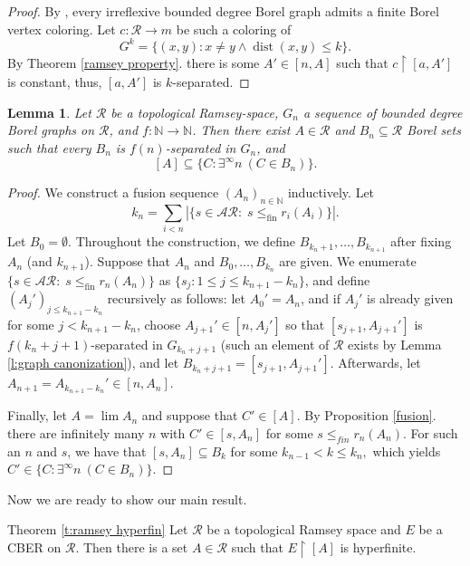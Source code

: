 \documentclass[11pt]{amsart}
\newcommand{\thistheoremname}{}
\newtheorem*{genericthm*}{\thistheoremname}
\newenvironment{namedthm*}[1]
{\renewcommand{\thistheoremname}{#1}%
	\begin{genericthm*}}
	{\end{genericthm*}}
\newcommand{\N}{\mathbb{N}}
\renewcommand{\restriction}[2]{#1 \upharpoonright #2}
\newtheorem{lemma}[theorem]{Lemma}
\theoremstyle{definition}
\numberwithin{equation}{section}
\DeclareMathOperator{\dist}{dist}
\newcommand{\mc}{\mathcal}
\newcommand{\rstr}{\restriction}
\newcommand{\sse}{\subseteq}
\newcommand{\est}{\emptyset}
\newcommand{\fA}{\mathcal{A}}
\newcommand{\fR}{\mathcal{R}}
\begin{document}
	
	
	\begin{proof}
		By \cite{KST}, every irreflexive bounded degree Borel graph admits a finite Borel vertex coloring. Let $c:\fR \to m$ be such a coloring of \[G^k=\{(x,y):x\neq y \wedge \dist(x,y)\le k \}.\] 
        By Theorem \ref{ramsey property}. there is some $A'\in[n,A]$ such that $\rstr{c}{[a,A']}$ is constant, thus, $[a,A']$ is $k$-separated. 
	\end{proof}
	
	
	\begin{lemma}\label{ramsey separation}
		Let $\fR$ be a topological Ramsey-space, $G_n$ a sequence of bounded degree Borel graphs on $\fR$, and $f:\N\to\N$. Then there exist $A\in\fR$ and $B_n\sse\fR$ Borel sets such that every $B_n$ is $f(n)$-separated in $G_n$, and 
		$$[A]\sse\{C:\exists^\infty n \ (C \in B_n)\}.$$
	\end{lemma}
	
	\begin{proof}
		We construct a fusion sequence $(A_n)_{n\in\N}$ inductively. Let 
		\[k_n=\sum_{i<n}|\{s\in\fA\fR: \; s\le_{\text{fin}}r_i(A_i)\} |.\]
		Let $B_0=\est.$ Throughout the construction, we define $B_{k_n+1}, \ldots, B_{k_{n+1}}$ after fixing $A_n$ (and  $k_{n+1}$).
		Suppose that $A_n$ and $B_0,\ldots, B_{k_n}$ are given. We enumerate $\{s\in\fA\fR: \; s\le_{\text{fin}}r_n(A_n)\}$ as $\{s_j: 1\le j\le k_{n+1}-k_n\}$, and define $(A_j')_{j\le k_{n+1}-k_n}$ recursively as follows: let $A_0'=A_n$, and if $A_j'$ is already given for some $j<k_{n+1}-k_n$, choose $A_{j+1}'\in [n,A_j']$ so that $[s_{j+1},A_{j+1}']$ is $f(k_n+j+1)$-separated in $G_{k_n+j+1}$ (such an element of $\fR$ exists by Lemma \ref{l:graph canonization}), and let $B_{k_n+j+1}=[s_{j+1},A_{j+1}']$. Afterwards, let $A_{n+1}=A_{k_{n+1}-k_n}'\in [n,A_n].$
		
		Finally, let $A=\lim A_n$ and suppose that $C'\in [A].$ By Proposition \ref{fusion}. there are infinitely many $n$ with $C'\in[s,A_n]$ for some $s\le_{fin}r_n(A_n)$. For such an $n$ and $s$, we have that $[s,A_n]\sse B_k$ for some $k_{n-1}<k\le k_n,$ which yields $C' \in\{C:\exists^\infty n \ (C \in B_n)\}$.
	\end{proof}

		Now we are ready to show our main result. 
	\begin{namedthm*}{Theorem \ref{t:ramsey hyperfin}}
		Let $\mathcal{R}$ be a topological Ramsey space and $E$ be a CBER on $\mathcal{R}$. Then there is a set $A \in \mc{R}$ such that $\restriction{E}{[A]}$ is hyperfinite. 
	\end{namedthm*}
	
\end{document}

